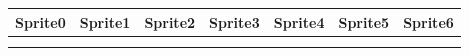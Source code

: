\begin{figure}[H]
  {
    \setlength{\tabcolsep}{1.0pt}
    \setlength\cmidrulewidth{\heavyrulewidth} %
    \begin{adjustbox}{width=14cm,center}
      \begin{tabular}{ccccccc}
        \toprule
        Sprite0 & Sprite1 & Sprite2 & Sprite3 & Sprite4 & Sprite5 & Sprite6 \\
        \midrule
\makecell[l]{
	\begin{subfigure}{0.3\textwidth}
    \def\MULTICOLORONE{gray}
    \def\MULTICOLORTWO{black}
    \def\SPRITECOLOR{yellow}
		
	\end{subfigure}
} &
\makecell[l]{
	\begin{subfigure}{0.3\textwidth}
    \def\MULTICOLORONE{gray}
    \def\MULTICOLORTWO{black}
    \def\SPRITECOLOR{green}
		
	\end{subfigure}
} &
\makecell[l]{
	\begin{subfigure}{0.3\textwidth}
    \def\MULTICOLORONE{gray}
    \def\MULTICOLORTWO{black}
    \def\SPRITECOLOR{lightblue}
		
	\end{subfigure}
} &
\makecell[l]{
	\begin{subfigure}{0.3\textwidth}
    \def\MULTICOLORONE{gray}
    \def\MULTICOLORTWO{black}
    \def\SPRITECOLOR{purple}
		
	\end{subfigure}
} &
\makecell[l]{
	\begin{subfigure}{0.3\textwidth}
    \def\MULTICOLORONE{gray}
    \def\MULTICOLORTWO{black}
    \def\SPRITECOLOR{blue}
		
	\end{subfigure}
} &
\makecell[l]{
	\begin{subfigure}{0.3\textwidth}
    \def\MULTICOLORONE{gray}
    \def\MULTICOLORTWO{black}
    \def\SPRITECOLOR{gray}
		
	\end{subfigure}
} &
\makecell[l]{
	\begin{subfigure}{0.3\textwidth}
    \def\MULTICOLORONE{gray}
    \def\MULTICOLORTWO{gray}
    \def\SPRITECOLOR{gray}
		
	\end{subfigure}
} \\ 
        \midrule
\makecell[l]{
	\begin{subfigure}{0.3\textwidth}
    \def\MULTICOLORONE{gray}
    \def\MULTICOLORTWO{white}
    \def\SPRITECOLOR{red}
		
	\end{subfigure}
}
\end{tabular}
\end{adjustbox}}
\end{figure}
